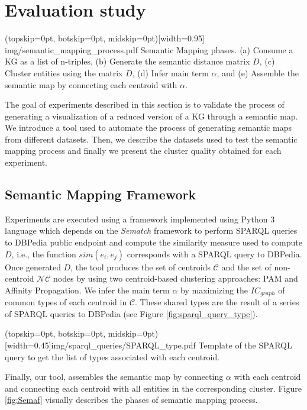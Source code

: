 \documentclass{ieeeaccess}
\begin{document}
\section{Evaluation study}
\label{sec:results}


\Figure[h!](topskip=0pt, botskip=0pt, midskip=0pt)[width=0.95\textwidth]
{img/semantic_mapping_process.pdf}
{Semantic Mapping phases. 
(a) Consume a KG as a list of n-triples, 
(b) Generate the semantic distance matrix $D$,
(c) Cluster entities using the matrix $D$,
(d) Infer main term $\alpha$, and
(e) Assemble the semantic map by connecting each centroid with $\alpha$.
\label{fig:Semaf}}


The goal of experiments described in this section is to validate the process
of generating a visualization of a reduced version of a KG through a semantic map. We introduce a tool used to automate the process of generating semantic
maps from different datasets. Then, we describe the datasets used to test the
semantic mapping process and 
finally we present the cluster quality obtained for each experiment.

\subsection{Semantic Mapping Framework}

Experiments are executed using a
framework implemented using Python 3 language which depends on the 
\textit{Sematch} framework \cite{ZHU201730} to perform SPARQL queries to 
DBPedia public endpoint and compute the similarity measure used to compute $D$, 
i.e., the function $sim(e_{i}, e_{j})$ corresponds with a SPARQL query to 
DBPedia. Once generated $D$, the tool produces the set of centroids 
$\mathcal{C}$ and the set of non-centroid $\mathcal{NC}$ nodes by using 
two centroid-based clustering approaches: PAM and Affinity Propagation. We infer
the main term $\alpha$ by maximizing the $IC_{graph}$ of common types of
each centroid in $\mathcal{C}$. These shared types are the result of a series 
of SPARQL queries to DBPedia (see Figure \ref{fig:sparql_query_type}). 

\Figure[h!](topskip=0pt, botskip=0pt, midskip=0pt)[width=0.45\textwidth]{img/sparql_queries/SPARQL_type.pdf}
{Template of the SPARQL query to get the list of types
associated with each centroid.
\label{fig:sparql_query_type}}

Finally, our tool,
assembles the semantic map by connecting $\alpha$ with each centroid and connecting 
each centroid with all entities in the corresponding cluster. Figure \ref{fig:Semaf} 
visually describes the phases of semantic mapping process.
\end{document}
